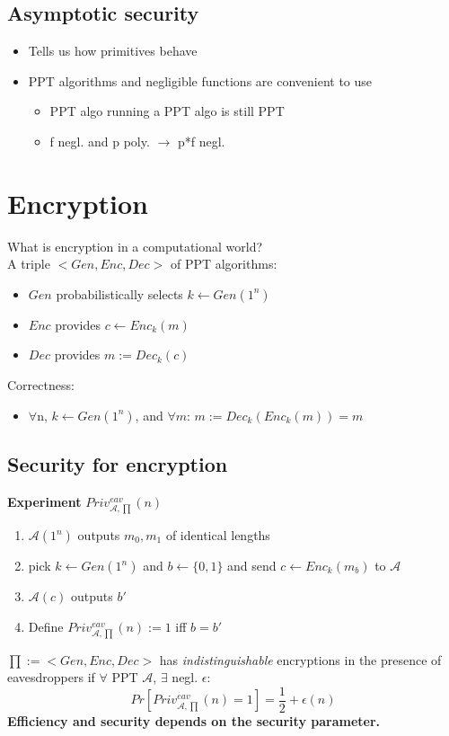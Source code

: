 \documentclass[12pt]{article}
\begin{document}
\subsection{Asymptotic security}
\begin{itemize}
\item Tells us how primitives behave
\item PPT algorithms and negligible functions are convenient to use
	\begin{itemize}
	\item PPT algo running a PPT algo is still PPT
	\item f negl. and p poly. $\rightarrow$ p*f negl.
	\end{itemize}
\end{itemize}
\newpage
\section{Encryption}
What is encryption in a computational world?\\
A triple $<Gen,Enc,Dec>$ of PPT algorithms:
\begin{itemize}
\item $Gen$ probabilistically selects $k \leftarrow Gen(1^n)$
\item $Enc$ provides $c \leftarrow Enc_k(m)$
\item $Dec$ provides $m:=Dec_k(c)$
\end{itemize}
Correctness:
\begin{itemize}
\item $\forall$n, $k \leftarrow Gen(1^n)$, and $\forall m$:  $m:=Dec_k(Enc_k(m)) = m$
\end{itemize}
\subsection{Security for encryption }
\textbf{Experiment} $Priv_{\mathcal{A},\prod}^{eav}(n)$

\begin{enumerate}
\item $\mathcal{A}(1^n)$ outputs $m_0,m_1$ of identical lengths
\item pick $k \leftarrow Gen(1^n)$ and  $b \leftarrow \{0,1\}$ and send $c \leftarrow Enc_k(m_b)$ to $\mathcal{A}$
 \item $\mathcal{A}(c)$ outputs $b'$
 \item Define $Priv_{\mathcal{A},\prod}^{eav}(n):=1$ iff $b=b'$
\end{enumerate}
$\prod:=<Gen,Enc,Dec>$ has \emph{indistinguishable} encryptions in the presence of eavesdroppers if $\forall$ PPT $\mathcal{A}$, $\exists$ negl. $\epsilon$:
\begin{equation}
Pr[Priv_{\mathcal{A},\prod}^{eav}(n)=1] = \frac{1}{2} + \epsilon(n)
\end{equation}
\textbf{Efficiency and security depends on the security parameter.}
\end{document}
